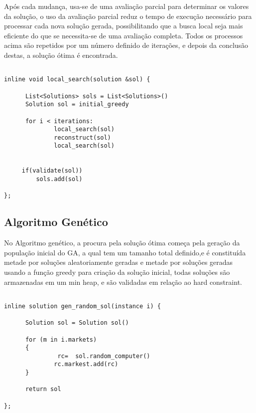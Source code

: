 \documentclass[12pt]{article}
\begin{document}
Após cada mudança, usa-se de uma avaliação parcial para determinar os valores da solução, o uso da avaliação parcial reduz o tempo de execução necessário para processar cada nova solução gerada, possibilitando que a busca local seja mais eficiente do que se necessita-se de uma avaliação completa. Todos os processos acima são repetidos por um número definido de iterações, e depois da conclusão destas, a solução ótima é encontrada.



\begin{lstlisting}

inline void local_search(solution &sol) {

      List<Solutions> sols = List<Solutions>()
      Solution sol = initial_greedy
        
      for i < iterations:
              local_search(sol)
              reconstruct(sol)
              local_search(sol)


     if(validate(sol))
         sols.add(sol)

};

\end{lstlisting}
\begingroup
{}
\endgroup




\subsection{Algoritmo Genético}


No Algoritmo genético, a procura pela solução ótima começa pela geração da população inicial do GA, a qual tem um tamanho total definido,e é constituída metade por soluções aleatoriamente geradas e metade por soluções geradas usando a função greedy para criação da solução inicial, todas soluções são armazenadas em um min heap, e são validadas em relação ao hard constraint.


\begin{lstlisting}

inline solution gen_random_sol(instance i) {

      Solution sol = Solution sol()
      
      for (m in i.markets)
      {
               rc=  sol.random_computer()
              rc.markest.add(rc)
      }

      return sol

};

\end{lstlisting}
\begingroup
{}
\endgroup
\end{document}
